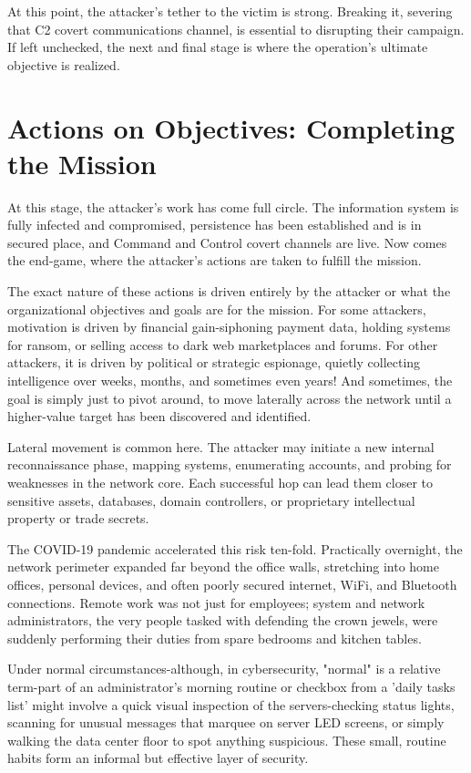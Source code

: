 At this point, the attacker's tether to the victim is strong. Breaking it, severing that C2 covert communications channel, is essential to disrupting their campaign. If left unchecked, the next and final stage is where the operation's ultimate objective is realized.

\section{Actions on Objectives: Completing the Mission}
At this stage, the attacker's work has come full circle. The information system is fully infected and compromised, persistence has been established and is in secured place, and Command and Control covert channels are live. Now comes the end-game, where the attacker's actions are taken to fulfill the mission.

The exact nature of these actions is driven entirely by the attacker or what the organizational objectives and goals are for the mission. For some attackers, motivation is driven by financial gain-siphoning payment data, holding systems for ransom, or selling access to dark web marketplaces and forums. For other attackers, it is driven by political or strategic espionage, quietly collecting intelligence over weeks, months, and sometimes even years! And sometimes, the goal is simply just to pivot around, to move laterally across the network until a higher-value target has been discovered and identified.

Lateral movement is common here. The attacker may initiate a new internal reconnaissance phase, mapping systems, enumerating accounts, and probing for weaknesses in the network core. Each successful hop can lead them closer to sensitive assets, databases, domain controllers, or proprietary intellectual property or trade secrets.

The COVID-19 pandemic accelerated this risk ten-fold. Practically overnight, the network perimeter expanded far beyond the office walls, stretching into home offices, personal devices, and often poorly secured internet, WiFi, and Bluetooth connections. Remote work was not just for employees; system and network administrators, the very people tasked with defending the crown jewels, were suddenly performing their duties from spare bedrooms and kitchen tables.

Under normal circumstances-although, in cybersecurity, "normal" is a relative term-part of an administrator's morning routine or checkbox from a 'daily tasks list' might involve a quick visual inspection of the servers-checking status lights, scanning for unusual messages that marquee on server LED screens, or simply walking the data center floor to spot anything suspicious. These small, routine habits form an informal but effective layer of security.

